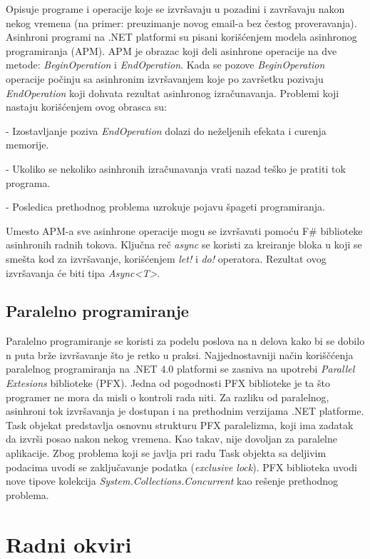 \documentclass[a4paper]{article}
\begin{document}
Opisuje programe i operacije koje se izvršavaju u pozadini i završavaju nakon nekog vremena (na primer: preuzimanje novog email-a bez čestog proveravanja). Asinhroni programi na .NET platformi su pisani korišćenjem modela asinhronog programiranja (APM)\cite{apm}. APM je obrazac koji deli asinhrone operacije na dve metode: {\em BeginOperation} i {\em EndOperation}. Kada se pozove {\em BeginOperation} operacije počinju sa asinhronim izvršavanjem koje po završetku pozivaju {\em EndOperation} koji dohvata rezultat asinhronog izračunavanja. Problemi koji nastaju korišćenjem ovog obrasca su: 

	- Izostavljanje poziva {\em EndOperation} dolazi do neželjenih efekata i curenja memorije. 
 
	- Ukoliko se nekoliko asinhronih izračunavanja vrati nazad teško je pratiti tok programa.
	
	- Posledica prethodnog problema uzrokuje pojavu špageti programiranja.

Umesto APM-a sve asinhrone operacije mogu se izvršavati pomoću F\# biblioteke asinhronih radnih tokova\cite{progFs}. Ključna reč {\em async} se koristi za kreiranje bloka u koji se smešta kod za izvršavanje, korišćenjem {\em let!} i {\em do!} operatora. Rezultat ovog izvršavanja će biti tipa {\em Async<T>}\cite{progFs}.

\subsection{Paralelno programiranje}

Paralelno programiranje se koristi za podelu poslova na n delova kako bi se dobilo n puta brže izvršavanje što je retko u praksi. Najjednostavniji način koriščćenja paralelnog programiranja na .NET 4.0 platformi se zasniva na upotrebi {\em Parallel Extesions} biblioteke (PFX)\cite{progFs}. Jedna od pogodnosti PFX biblioteke je ta što programer ne mora da misli o kontroli rada niti. Za razliku od paralelnog, asinhroni tok izvršavanja je dostupan i na prethodnim verzijama .NET platforme. Task objekat predstavlja osnovnu strukturu PFX paralelizma, koji ima zadatak da izvrši posao nakon nekog vremena. Kao takav, nije dovoljan za paralelne aplikacije. Zbog problema koji se javlja pri radu Task objekta sa deljivim podacima uvodi se zaključavanje podatka ({\em exclusive lock}). PFX biblioteka uvodi nove tipove kolekcija {\em System.Collections.Concurrent} \cite{sysCC} kao rešenje prethodnog problema.  


\section{Radni okviri}
\end{document}
